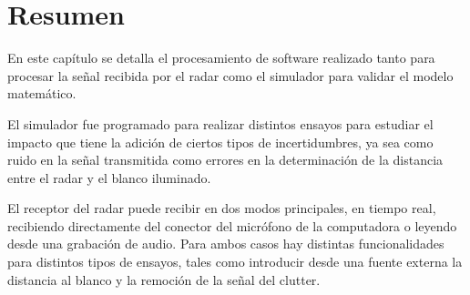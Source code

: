 \section{Resumen}

En este capítulo se detalla el procesamiento de software realizado tanto para procesar la señal recibida por el radar como el simulador para validar el modelo matemático.

El simulador fue programado para realizar distintos ensayos para estudiar el impacto que tiene la adición de ciertos tipos de incertidumbres, ya sea como ruido en la señal transmitida como errores en la determinación de la distancia entre el radar y el blanco iluminado.

El receptor del radar puede recibir en dos modos principales, en tiempo real, recibiendo directamente del conector del micrófono de la computadora o leyendo desde una grabación de audio. Para ambos casos hay distintas funcionalidades para distintos tipos de ensayos, tales como introducir desde una fuente externa la distancia al blanco y la remoción de la señal del clutter.
